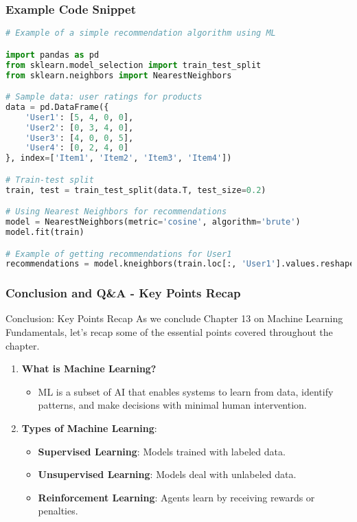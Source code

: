\documentclass[aspectratio=169]{beamer}
\begin{document}
\begin{frame}[fragile]
  \frametitle{Example Code Snippet}
  \begin{lstlisting}[language=Python]
# Example of a simple recommendation algorithm using ML

import pandas as pd
from sklearn.model_selection import train_test_split
from sklearn.neighbors import NearestNeighbors

# Sample data: user ratings for products
data = pd.DataFrame({
    'User1': [5, 4, 0, 0],
    'User2': [0, 3, 4, 0],
    'User3': [4, 0, 0, 5],
    'User4': [0, 2, 4, 0]
}, index=['Item1', 'Item2', 'Item3', 'Item4'])

# Train-test split
train, test = train_test_split(data.T, test_size=0.2)

# Using Nearest Neighbors for recommendations
model = NearestNeighbors(metric='cosine', algorithm='brute')
model.fit(train)

# Example of getting recommendations for User1
recommendations = model.kneighbors(train.loc[:, 'User1'].values.reshape(1, -1), n_neighbors=2)
  \end{lstlisting}
\end{frame}

\begin{frame}[fragile]
    \frametitle{Conclusion and Q\&A - Key Points Recap}
    \begin{block}{Conclusion: Key Points Recap}
        As we conclude Chapter 13 on Machine Learning Fundamentals, let’s recap some of the essential points covered throughout the chapter.
    \end{block}
    \begin{enumerate}
        \item \textbf{What is Machine Learning?}
          \begin{itemize}
              \item ML is a subset of AI that enables systems to learn from data, identify patterns, and make decisions with minimal human intervention. 
          \end{itemize}
        \item \textbf{Types of Machine Learning}:
          \begin{itemize}
              \item \textbf{Supervised Learning}: Models trained with labeled data.
              \item \textbf{Unsupervised Learning}: Models deal with unlabeled data.
              \item \textbf{Reinforcement Learning}: Agents learn by receiving rewards or penalties.
          \end{itemize}
    \end{enumerate}
\end{frame}
\end{document}
